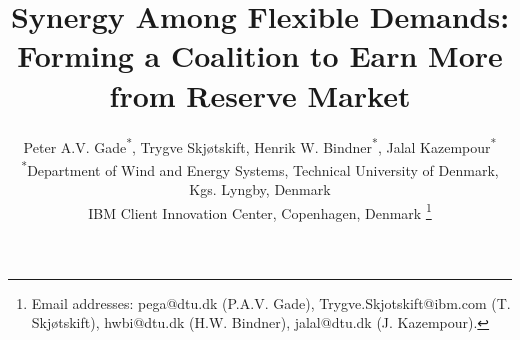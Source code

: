 \documentclass[conference]{IEEEtran}
\begin{document}
\title{Synergy Among Flexible Demands: Forming a Coalition to Earn More from Reserve Market}

\author{Peter A.V. Gade\textsuperscript{*}\textsuperscript{\textdagger}, Trygve Skjøtskift\textsuperscript{\textdagger}, Henrik W. Bindner\textsuperscript{*}, Jalal Kazempour\textsuperscript{*} \\
    \textsuperscript{*}Department of Wind and Energy Systems, Technical University of Denmark, Kgs. Lyngby, Denmark \\
    \textsuperscript{\textdagger}IBM Client Innovation Center, Copenhagen, Denmark
    \thanks{
        Email addresses: pega@dtu.dk (P.A.V. Gade), Trygve.Skjotskift@ibm.com (T. Skjøtskift), hwbi@dtu.dk (H.W. Bindner), jalal@dtu.dk (J. Kazempour).}%

    \vspace{-3mm}
}




\maketitle

\end{document}
